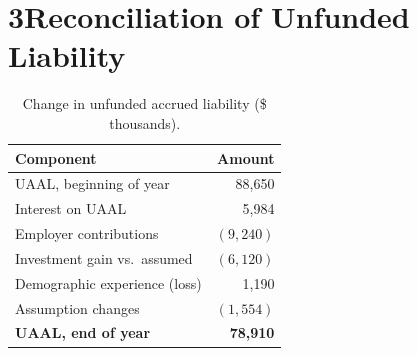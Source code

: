 \section{3\quad Reconciliation of Unfunded Liability}
\begin{table}[ht]\centering
\caption{Change in unfunded accrued liability (\$ thousands).}
\begin{tabularx}{\linewidth}{@{}X R@{}}
\toprule
\textbf{Component} & \textbf{Amount}\\
\midrule
UAAL, beginning of year        & 88{,}650\\
Interest on UAAL               & \phantom{0}5{,}984\\
Employer contributions         & $(9{,}240)$\\
Investment gain vs.\ assumed   & $(6{,}120)$\\
Demographic experience (loss)  & \phantom{00}1{,}190\\
Assumption changes             & $(1{,}554)$\\
\midrule
\textbf{UAAL, end of year}     & \textbf{78{,}910}\\
\bottomrule
\end{tabularx}
\end{table}
